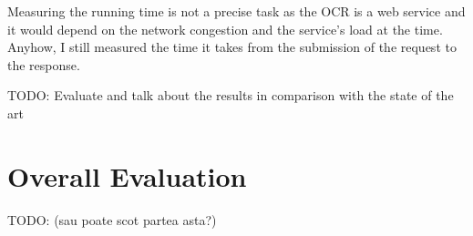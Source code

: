 Measuring the running time is not a precise task as the OCR is a web service and it would depend on the network congestion and the service's load at the time. Anyhow, I still measured the time it takes from the submission of the request to the response.

TODO: Evaluate and talk about the results in comparison with the state of the art

\section{Overall Evaluation}\label{section:evaluation-overall}

TODO: (sau poate scot partea asta?)
